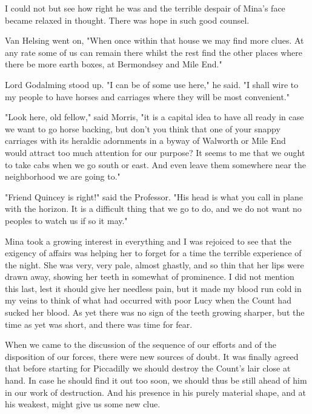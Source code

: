 I could not but see how right he was and the terrible despair of Mina's face became relaxed in thought. There was hope in such good counsel. 

Van Helsing went on, "When once within that house we may find more clues. At any rate some of us can remain there whilst the rest find the other places where there be more earth boxes, at Bermondsey and Mile End." 

Lord Godalming stood up. "I can be of some use here," he said. "I shall wire to my people to have horses and carriages where they will be most convenient." 

"Look here, old fellow," said Morris, "it is a capital idea to have all ready in case we want to go horse backing, but don't you think that one of your snappy carriages with its heraldic adornments in a byway of Walworth or Mile End would attract too much attention for our purpose? It seems to me that we ought to take cabs when we go south or east. And even leave them somewhere near the neighborhood we are going to." 

"Friend Quincey is right!" said the Professor. "His head is what you call in plane with the horizon. It is a difficult thing that we go to do, and we do not want no peoples to watch us if so it may." 

Mina took a growing interest in everything and I was rejoiced to see that the exigency of affairs was helping her to forget for a time the terrible experience of the night. She was very, very pale, almost ghastly, and so thin that her lips were drawn away, showing her teeth in somewhat of prominence. I did not mention this last, lest it should give her needless pain, but it made my blood run cold in my veins to think of what had occurred with poor Lucy when the Count had sucked her blood. As yet there was no sign of the teeth growing sharper, but the time as yet was short, and there was time for fear. 

When we came to the discussion of the sequence of our efforts and of the disposition of our forces, there were new sources of doubt. It was finally agreed that before starting for Piccadilly we should destroy the Count's lair close at hand. In case he should find it out too soon, we should thus be still ahead of him in our work of destruction. And his presence in his purely material shape, and at his weakest, might give us some new clue. 

